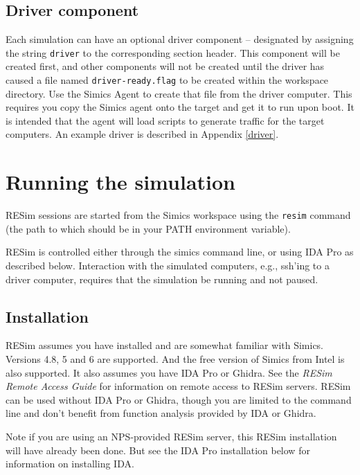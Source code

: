 \documentclass[titlepage]{article}
\begin{document}
\subsection{Driver component}
Each simulation can have an optional driver component -- designated by assigning the string {\tt driver} to the corresponding
section header.  This component will be created first, and other components will not be created until the driver has
caused a file named {\tt driver-ready.flag} to be created within the workspace directory.  Use the Simics Agent to 
create that file from the driver computer.  This requires you copy the Simics agent onto the target and get it to run
upon boot.  It is intended that the agent will load scripts to generate traffic for the target computers.  
An example driver is described in Appendix \ref{driver}.   

\section{Running the simulation}
\label{running}
RESim sessions are started from the Simics workspace using the {\tt resim} command (the path to which should be in your PATH
environment variable).

RESim is controlled either through the simics command line, or using IDA Pro as described below.  Interaction with the simulated
computers, e.g., ssh'ing to a driver computer, requires that the simulation be running and not paused.

\subsection{Installation}
\label{installation}
RESim assumes you have installed and are somewhat familiar with Simics.  Versions 4.8, 5 and 6 are supported.
And the free version of Simics from Intel is also supported.
It also assumes you have IDA Pro or Ghidra. See the \textit{RESim Remote Access Guide} for information on remote access to RESim
servers.  RESim can be used without IDA Pro or Ghidra, though you are limited to the command line and don't benefit from
function analysis provided by IDA or Ghidra.

Note if you are using an NPS-provided RESim server, this RESim installation will have already been done.  But
see the IDA Pro installation below for information on installing IDA. 
\end{document}

